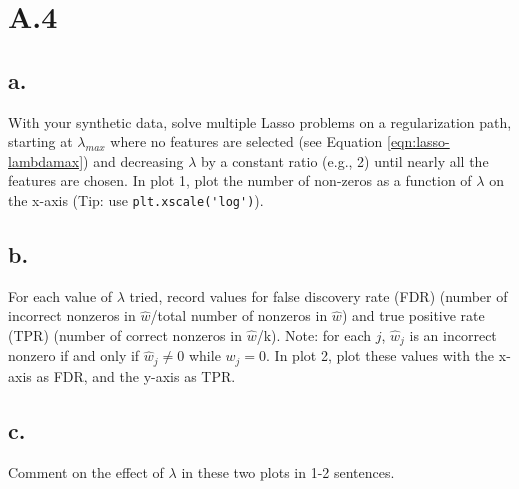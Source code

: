 \documentclass{article}
\newcommand{\1}{\mathbf{1}}
\begin{document}
\section*{A.4}
{\Large 



\subsection*{a.}

With your synthetic data, solve multiple Lasso problems on a regularization path, starting at $\lambda_{max}$ where no features are selected (see Equation \eqref{eqn:lasso-lambdamax}) and decreasing $\lambda$ by a constant ratio (e.g., 2) until nearly all the features are chosen. 
    In plot 1, plot the number of non-zeros as a function of $\lambda$ on the x-axis (Tip: use \verb|plt.xscale('log')|).

\subsection*{b.}

For each value of $\lambda$ tried, record values for false discovery rate (FDR) (number of incorrect nonzeros in $\widehat{w}$/total number of nonzeros in $\widehat{w}$) and true positive rate (TPR)
    (number of correct nonzeros in $\widehat{w}$/k). Note: for each $j$, $\widehat{w}_j$ is an incorrect nonzero if and only if $\widehat{w}_j \neq 0$ while $w_j = 0$.
In plot 2, plot these values with the x-axis as FDR, and the y-axis as TPR.

\subsection*{c.}

Comment on the effect of $\lambda$ in these two plots in 1-2 sentences.

}
\end{document}
